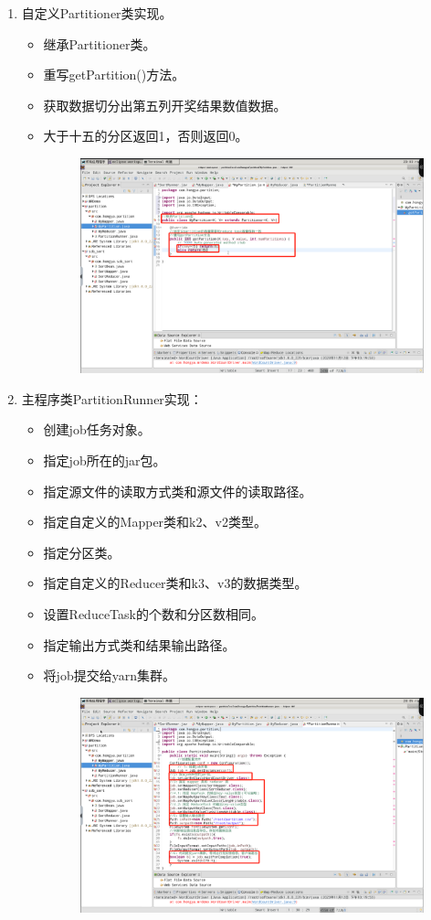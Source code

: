 \documentclass {article}
\begin{document}
\begin{enumerate}
					\item 自定义Partitioner类实现。
					\begin{itemize}
						\item 继承Partitioner类。
						\item 重写getPartition()方法。
						\item 获取数据切分出第五列开奖结果数值数据。
						\item 大于十五的分区返回1，否则返回0。
						\begin{figure}[H]
							\centering
							\includegraphics[width=4.5in]{figures/fig12.png}
						\end{figure}
					\end{itemize}
				
					\item 主程序类PartitionRunner实现：
					\begin{itemize}
						\item 创建job任务对象。
						\item 指定job所在的jar包。
						\item 指定源文件的读取方式类和源文件的读取路径。
						\item 指定自定义的Mapper类和k2、v2类型。
						\item 指定分区类。
						\item 指定自定义的Reducer类和k3、v3的数据类型。
						\item 设置ReduceTask的个数和分区数相同。
						\item 指定输出方式类和结果输出路径。
						\item 将job提交给yarn集群。
						\begin{figure}[H]
							\centering
							\includegraphics[width=4.5in]{figures/fig13.png}
						\end{figure}
					\end{itemize}
				\end{enumerate}
				
\end{document}
